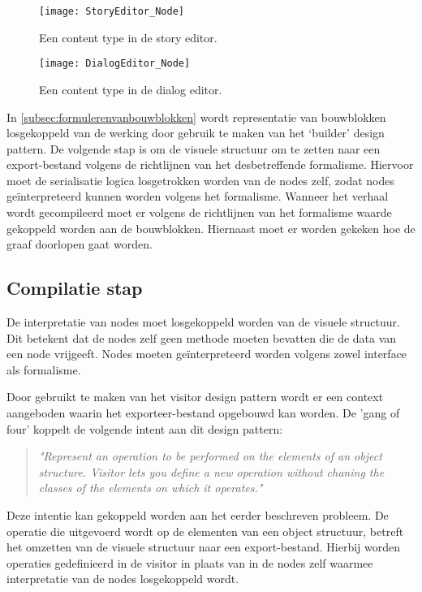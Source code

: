 \begin{figure}[htb]
    \centering    
    \texttt{[image: StoryEditor\_Node]}
    \caption{Een content type in de story editor.}
    \label{fig:storyeditorcontenttype}
\end{figure}

\begin{figure}[htb]
    \centering    
    \texttt{[image: DialogEditor\_Node]}
    \caption{Een content type in de dialog editor.}
    \label{fig:dialogeditorcontenttype}
\end{figure}

In \autoref{subsec:formulerenvanbouwblokken} wordt representatie van bouwblokken losgekoppeld van de werking door gebruik te maken van het ‘builder’ design pattern. De volgende stap is om de visuele structuur om te zetten naar een export-bestand volgens de richtlijnen van het desbetreffende formalisme. Hiervoor moet de serialisatie logica losgetrokken worden van de nodes zelf, zodat nodes geïnterpreteerd kunnen worden volgens het formalisme. Wanneer het verhaal wordt gecompileerd moet er volgens de richtlijnen van het formalisme waarde gekoppeld worden aan de bouwblokken. Hiernaast moet er worden gekeken hoe de graaf doorlopen gaat worden.

\subsection{Compilatie stap}
De interpretatie van nodes moet losgekoppeld worden van de visuele structuur. Dit betekent dat de nodes zelf geen methode moeten bevatten die de data van een node vrijgeeft. Nodes moeten geïnterpreteerd worden volgens zowel interface als formalisme. 

Door gebruikt te maken van het visitor design pattern wordt er een context aangeboden waarin het exporteer-bestand opgebouwd kan worden. De 'gang of four' koppelt de volgende intent aan dit design pattern\cite{DesignPatterns}:

\begin{quote} 
    \centering    
    \textit{
        "Represent an operation to be performed on the elements of an object structure. Visitor lets you define a new operation without chaning the classes of the elements on which it operates."     
    }
\end{quote}

Deze intentie kan gekoppeld worden aan het eerder beschreven probleem. De operatie die uitgevoerd wordt op de elementen van een object structuur, betreft het omzetten van de visuele structuur naar een export-bestand. Hierbij worden operaties gedefinieerd in de visitor in plaats van in de nodes zelf waarmee interpretatie van de nodes losgekoppeld wordt.

